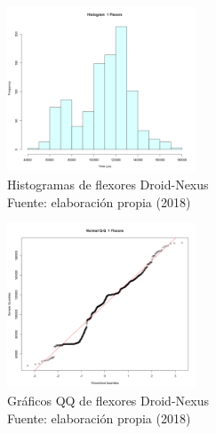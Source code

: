 \begin{figure}
 \begin{center} 
   	\includegraphics[width=0.5\textwidth]{evaluation/graphics/Droid/Nexus/HistFlexorsDroidNexus.png} 
    \caption[Histogramas de flexores Droid-Nexus]{Histogramas de flexores  Droid-Nexus\\Fuente: elaboración propia (2018)} 
    \label{fig:droid-nexus-hist-flexors}
  \end{center}
\end{figure}

\begin{figure}[H]
  \begin{center} 
   	\includegraphics[width=0.5\textwidth]{evaluation/graphics/Droid/Nexus/NormalQQFlexorsDroidNexus.png} 
    \caption[Gráfico QQ de flexores Droid-Nexus]{Gráficos QQ de flexores Droid-Nexus\\Fuente: elaboración propia (2018)} 
    \label{fig:droid-nexus-QQ-flexors}
  \end{center}
\end{figure}

